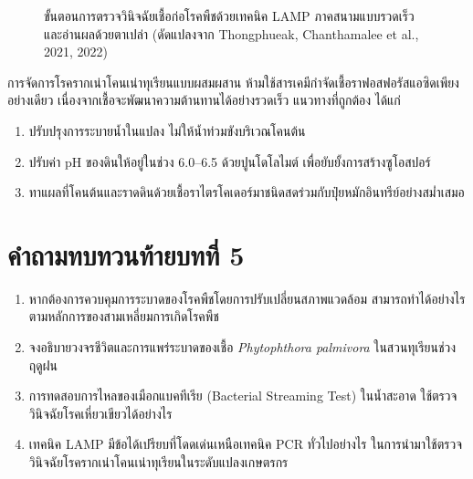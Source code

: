 \begin{figure}[H]
\caption{ขั้นตอนการตรวจวินิจฉัยเชื้อก่อโรคพืชด้วยเทคนิค LAMP ภาคสนามแบบรวดเร็วและอ่านผลด้วยตาเปล่า (ดัดแปลงจาก Thongphueak, Chanthamalee et al., 2021, 2022)}
\label{fig:lamp_diagnostic_workflow}
\end{figure}

\begin{warningbox}{การจัดการโรครากเน่าโคนเน่าทุเรียนแบบผสมผสาน}
ห้ามใช้สารเคมีกำจัดเชื้อราฟอสฟอรัสแอซิดเพียงอย่างเดียว เนื่องจากเชื้อจะพัฒนาความต้านทานได้อย่างรวดเร็ว แนวทางที่ถูกต้อง ได้แก่
\begin{enumerate}
    \item ปรับปรุงการระบายน้ำในแปลง ไม่ให้น้ำท่วมขังบริเวณโคนต้น
    \item ปรับค่า pH ของดินให้อยู่ในช่วง 6.0--6.5 ด้วยปูนโดโลไมต์ เพื่อยับยั้งการสร้างซูโอสปอร์
    \item ทาแผลที่โคนต้นและราดดินด้วยเชื้อราไตรโคเดอร์มาชนิดสดร่วมกับปุ๋ยหมักอินทรีย์อย่างสม่ำเสมอ
\end{enumerate}
\end{warningbox}

\section*{คำถามทบทวนท้ายบทที่ 5}
\begin{enumerate}
    \item หากต้องการควบคุมการระบาดของโรคพืชโดยการปรับเปลี่ยนสภาพแวดล้อม สามารถทำได้อย่างไรตามหลักการของสามเหลี่ยมการเกิดโรคพืช
    \item จงอธิบายวงจรชีวิตและการแพร่ระบาดของเชื้อ \textit{Phytophthora palmivora} ในสวนทุเรียนช่วงฤดูฝน
    \item การทดสอบการไหลของเมือกแบคทีเรีย (Bacterial Streaming Test) ในน้ำสะอาด ใช้ตรวจวินิจฉัยโรคเหี่ยวเขียวได้อย่างไร
    \item เทคนิค LAMP มีข้อได้เปรียบที่โดดเด่นเหนือเทคนิค PCR ทั่วไปอย่างไร ในการนำมาใช้ตรวจวินิจฉัยโรครากเน่าโคนเน่าทุเรียนในระดับแปลงเกษตรกร
\end{enumerate}

\clearpage